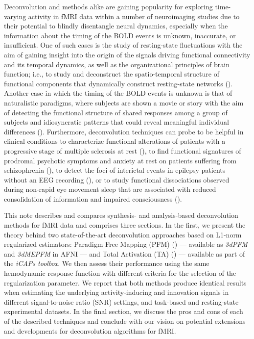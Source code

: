 Deconvolution and methods alike are gaining popularity for exploring time-varying activity in fMRI data within a number of neuroimaging studies due to their potential to blindly disentangle neural dynamics, especially when the information about the timing of the BOLD events is unknown, inaccurate, or insufficient. One of such cases is the study of resting-state fluctuations with the aim of gaining insight into the origin of the signals driving functional connectivity and its temporal dynamics, as well as the organizational principles of brain function; i.e., to study and deconstruct the spatio-temporal structure of functional components that dynamically construct resting-state networks (\citealt{petridou2013PeriodsRestFMRI,karahanoglu2015TransientBrainActivity,karahanoglu2017DynamicsLargescaleFMRI,kinany2020DynamicFunctionalConnectivity,gonzalez-castillo2019ImagingSpontaneousFlow,allan2015FunctionalConnectivityMRI, zamaniesfahlani2020HighamplitudeCofluctuationsCortical}). Another case in which the timing of the BOLD events is unknown is that of naturalistic paradigms, where subjects are shown a movie or story with the aim of detecting the functional structure of shared responses among a group of subjects and idiosyncratic patterns that could reveal meaningful individual differences (\citealt{finn2020MoviewatchingOutperformsRest,finn2020IdiosynchronySharedResponses,betzel2020TemporalFluctuationsBrain,faskowitz2020EdgecentricFunctionalNetwork}). Furthermore, deconvolution techniques can probe to be helpful in clinical conditions to characterize functional alterations of patients with a progressive stage of multiple sclerosis at rest (\citealt{bommarito2020FunctionalNetworkDynamicsa}), to find functional signatures of prodromal psychotic symptoms and anxiety at rest on patients suffering from schizophrenia (\citealt{zoller2019LargeScaleBrainNetwork}), to detect the foci of interictal events in epilepsy patients without an EEG recording (\citealt{lopes2012DetectionEpilepticActivity}), or to study functional dissociations observed during non-rapid eye movement sleep that are associated with reduced consolidation of information and impaired consciousness (\citealt{tarun2021NREMSleepStagesa}).

This note describes and compares synthesis- and analysis-based deconvolution methods for fMRI data and comprises three sections. In the first, we present the theory behind two state-of-the-art deconvolution approaches based on L1-norm regularized estimators: Paradigm Free Mapping (PFM) (\citealt{caballerogaudes2013ParadigmFreeMapping}) --- available as \textit{3dPFM} and \textit{3dMEPFM} in AFNI --- and Total Activation (TA) (\citealt{karahanoglu2013TotalActivationFMRI}) --- available as part of the \textit{iCAPs toolbox}. We then assess their performance using the same hemodynamic response function with different criteria for the selection of the regularization parameter. We report that both methods produce identical results when estimating the underlying activity-inducing and innovation signals in different signal-to-noise ratio (SNR) settings, and task-based and resting-state experimental datasets. In the final section, we discuss the pros and cons of each of the described techniques and conclude with our vision on potential extensions and developments for deconvolution algorithms for fMRI.